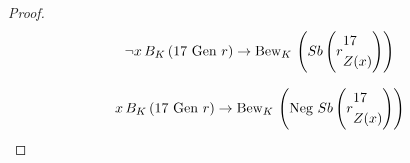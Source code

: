 \begin{proof}
    \begin{equation} \label{eq:TeoVI-15}
        \lnot x \thinspace B_K \thinspace (17 \text{ Gen } r) \rightarrow \text{Bew}_K \thinspace \left(Sb\left(r
        \begin{aligned}
            &17 \\
            &Z(x)
        \end{aligned}
        \right)\right)
    \end{equation}

    \begin{equation} \label{eq:TeoVI-16}
        x \thinspace B_K \thinspace (17 \text{ Gen } r) \rightarrow \text{Bew}_K \thinspace \left(\text{Neg } Sb\left(r
        \begin{aligned}
            &17 \\
            &Z(x)
        \end{aligned}
        \right)\right)
    \end{equation}


\end{proof}
